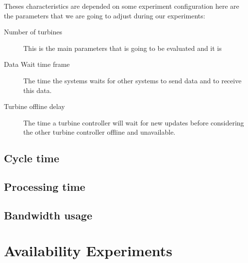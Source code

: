 \noindent Theses characteristics are depended on some experiment configuration here are the parameters that we are going to adjust during our experiments:

\begin{description}
	\item [Number of turbines] This is the main parameters that is going to be evaluated and it is 
	\item [Data Wait time frame] The time the systems waits for other systems to send data and to receive this data.
	\item [Turbine offline delay] The time a turbine controller will wait for new updates before considering the other turbine controller offline and unavailable.
\end{description}



\subsection{Cycle time}

\subsection{Processing time}

\subsection{Bandwidth usage}

\section{Availability Experiments}